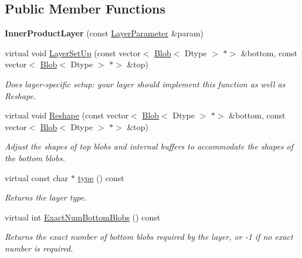 \subsection*{Public Member Functions}
\begin{DoxyCompactItemize}
\item 
\mbox{\label{classcaffe_1_1_inner_product_layer_a997e3c54ed0414ebcd8eec13f083af07}} 
{\bfseries Inner\+Product\+Layer} (const \mbox{\hyperlink{classcaffe_1_1_layer_parameter}{Layer\+Parameter}} \&param)
\item 
virtual void \mbox{\hyperlink{classcaffe_1_1_inner_product_layer_a4adc29913343ddec1813f3a899e449cc}{Layer\+Set\+Up}} (const vector$<$ \mbox{\hyperlink{classcaffe_1_1_blob}{Blob}}$<$ Dtype $>$ $\ast$$>$ \&bottom, const vector$<$ \mbox{\hyperlink{classcaffe_1_1_blob}{Blob}}$<$ Dtype $>$ $\ast$$>$ \&top)
\begin{DoxyCompactList}\small\item\em Does layer-\/specific setup\+: your layer should implement this function as well as Reshape. \end{DoxyCompactList}\item 
virtual void \mbox{\hyperlink{classcaffe_1_1_inner_product_layer_a1c823624ec9286477db7caa5188152b8}{Reshape}} (const vector$<$ \mbox{\hyperlink{classcaffe_1_1_blob}{Blob}}$<$ Dtype $>$ $\ast$$>$ \&bottom, const vector$<$ \mbox{\hyperlink{classcaffe_1_1_blob}{Blob}}$<$ Dtype $>$ $\ast$$>$ \&top)
\begin{DoxyCompactList}\small\item\em Adjust the shapes of top blobs and internal buffers to accommodate the shapes of the bottom blobs. \end{DoxyCompactList}\item 
\mbox{\label{classcaffe_1_1_inner_product_layer_af10fcfd9a34e23809c4374633c174bee}} 
virtual const char $\ast$ \mbox{\hyperlink{classcaffe_1_1_inner_product_layer_af10fcfd9a34e23809c4374633c174bee}{type}} () const
\begin{DoxyCompactList}\small\item\em Returns the layer type. \end{DoxyCompactList}\item 
virtual int \mbox{\hyperlink{classcaffe_1_1_inner_product_layer_a5afdeb6b448b2f7d0637afa554381500}{Exact\+Num\+Bottom\+Blobs}} () const
\begin{DoxyCompactList}\small\item\em Returns the exact number of bottom blobs required by the layer, or -\/1 if no exact number is required. \end{DoxyCompactList}\item 

\end{DoxyCompactItemize}
